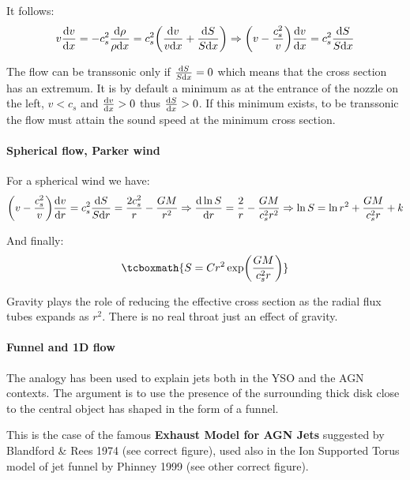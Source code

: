 \documentclass[10pt,a4paper,english]{article}
\let\originalleft\left
\let\originalright\right
\renewcommand{\left}{\mathopen{}\mathclose\bgroup\originalleft}
\renewcommand{\right}{\aftergroup\egroup\originalright}
\begin{document}
It follows:
\begin{equation}
    v\frac{\d v}{\d x} = -c_s^2\frac{\d\rho}{\rho \d x} = c_s^2\left(\frac{\d v}{v\d x}+\frac{\d S}{S\d x}\right)
    \Rightarrow \left( v - \frac{c_s^2}{v} \right)\frac{\d v}{\d x} = c_s^2\frac{\d S}{S \d x}
\end{equation}

The flow can be transsonic only if $\frac{\mathrm{d} S}{S\mathrm{d} x} = 0 $ which means that
the cross section has an extremum. It is by default a minimum as at the
entrance of the nozzle on the left, $v<c_s$ and $\frac{\mathrm{d} v}{\mathrm{d} x} > 0$ thus
$\frac{\mathrm{d} S}{\mathrm{d} x} > 0 $. If this minimum exists, to be transsonic the flow
must attain the sound speed at the minimum cross section.

\paragraph{Spherical flow, Parker wind}

For a spherical wind we have:
\begin{equation}
    \left( v - \frac{c_s^2}{v}  \right)\frac{\d v}{\d r} = c_s^2\frac{\d S}{S\d r}
    = \frac{2c_s^2}{r} - \frac{GM}{r^2} \Rightarrow \frac{\d \ln S}{\d r} =
    \frac{2}{r} - \frac{GM}{c_s^2 r^2}
    \Rightarrow \ln S = \ln r^2 +\frac{GM}{c_s^2r} + k
\end{equation}

And finally:
\begin{equation}
    \tcboxmath{S = Cr^2 \exp\left(\frac{GM}{c_s^2 r}\right)}
\end{equation}

Gravity plays the role of reducing the effective cross section as the radial
flux tubes expands as $r^2$. There is no real throat just an effect of gravity.

\paragraph{Funnel and 1D flow}
The analogy has been used to explain jets both in the YSO and the AGN contexts.
The argument is to use the presence of the surrounding thick disk close to the
central object has shaped in the form of a funnel. 

This is the case of the famous \textbf{ Exhaust Model for AGN Jets} suggested
by Blandford \& Rees 1974 (see correct figure), used also in the Ion Supported
Torus model of jet funnel by Phinney 1999 (see other correct figure).
\end{document}
